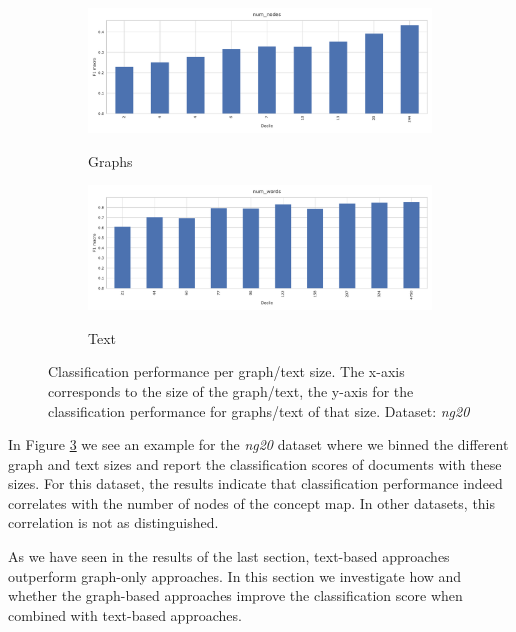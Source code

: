 \begin{figure}[htb!]
	\begin{subfigure}[t]{.5\linewidth}	{\includegraphics[width=\linewidth]{assets/figures/graph_binning_num_nodes.pdf}\label{fig:todo_1}}
	\caption{Graphs}
	\end{subfigure}
	\hfill
		\begin{subfigure}[t]{.5\linewidth}
	{\includegraphics[width=\linewidth]{assets/figures/text_binning_num_words.pdf}\label{fig:todo_2}}
	\caption{Text}
	\end{subfigure}
	\caption[Statistics: Histogram of classification performance per graph/text size]{Classification performance per graph/text size. The x-axis corresponds to the size of the graph/text, the y-axis for the classification performance for graphs/text of that size. Dataset: \textit{ng20}}\label{fig:graph_size_performance}
\end{figure}

In Figure \ref{fig:graph_size_performance} we see an example for the \textit{ng20} dataset where we binned the different graph and text sizes and report the classification scores of documents with these sizes.
For this dataset, the results indicate that classification performance indeed correlates with the number of nodes of the concept map.
In other datasets, this correlation is not as distinguished.


As we have seen in the results of the last section, text-based approaches outperform graph-only approaches.
In this section we investigate how and whether the graph-based approaches improve the classification score when combined with text-based approaches.


